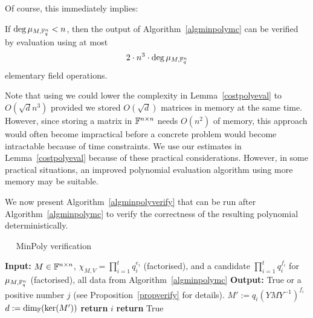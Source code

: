 \smallskip
Of course, this immediately implies:

\begin{Cor}
If $\deg \mu_{M,\mathbb{F}_q^n} < n$, then the output of Algorithm~\ref{algminpolymc} 
can be verified by evaluation using at most 
\[ 2\cdot n^3 \cdot \deg \mu_{M,\mathbb{F}_q^n} \] 
elementary field operations.
\end{Cor}

\begin{Rem}
Note that using \cite[Theorem 2]{AC97} we could lower the complexity
in Lemma~\ref{costpolyeval} to $O(\sqrt d n^3)$ provided we 
stored $O(\sqrt d)$ matrices in memory at the same time. However, since
storing a matrix in $\mathbb{F}^{n \times n}$ needs $O(n^2)$ of memory, this
approach would often become impractical before  a
concrete problem would become intractable because of time constraints. 
We use our estimates in Lemma~\ref{costpolyeval} because of
these practical considerations.
However, in some practical situations, an improved polynomial evaluation
algorithm using more memory may be suitable.
\end{Rem}

We now present Algorithm~\ref{algminpolyverify} that can be run after
Algorithm~\ref{algminpolymc} to verify the correctness of the resulting polynomial
deterministically.

\begin{algorithm}
\caption{$\quad$ \sc MinPoly verification}
\label{algminpolyverify}
%
\begin{algorithmic}
\STATE \textbf{Input:} $M \in \mathbb{F}^{n \times n}$, $\chi_{M,V} = \prod_{i=1}^t q_i^{e_i}$ (factorised), 
and a candidate $\prod_{i=1}^t q_i^{f_i}$ for $\mu_{M,\mathbb{F}_q^n}$ (factorised),
all data from Algorithm~\ref{algminpolymc}
\STATE \textbf{Output:} {\sc True} or a positive number $j$ (see
Proposition~\ref{propverify} for details).
\vspace*{2mm}
        \STATE $M' := q_i(YMY^{-1})^{f_i}$
        \STATE $d := \dim_{\mathbb{F}}( \ker(M') )$
            \STATE \textbf{return} $i$
        \ENDIF
    \ENDIF
\ENDFOR
\STATE \textbf{return} {\sc True}
\end{algorithmic}
\end{algorithm}

